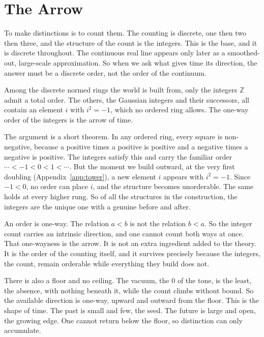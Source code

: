 \section{The Arrow} \label{sec:arrow}

To make distinctions is to count them. The counting is discrete, one then two then three, and the structure of the
count is the integers. This is the base, and it is discrete throughout. The continuous real line appears only later as
a smoothed-out, large-scale approximation. So when we ask what gives time its direction, the answer must be a discrete
order, not the order of the continuum.

\begin{principle}
Among the discrete normed rings the world is built from, only the integers $\mathbb{Z}$ admit a total order. The
others, the Gaussian integers and their successors, all contain an element $i$ with $i^2 = -1$, which no ordered ring
allows. The one-way order of the integers is the arrow of time.
\end{principle}

The argument is a short theorem. In any ordered ring, every square is non-negative, because a positive times a
positive is positive and a negative times a negative is positive. The integers satisfy this and carry the familiar
order $\cdots < -1 < 0 < 1 < \cdots$. But the moment we build outward, at the very first doubling (Appendix~\ref{app:tower}),
a new element $i$ appears with $i^2 = -1$. Since $-1 < 0$, no order can place $i$, and the structure becomes
unorderable. The same holds at every higher rung. So of all the structures in the construction, the integers are the
unique one with a genuine before and after.

An order is one-way. The relation $a < b$ is not the relation $b < a$. So the integer count carries an intrinsic
direction, and one cannot count both ways at once. That one-wayness is the arrow. It is not an extra ingredient added
to the theory. It is the order of the counting itself, and it survives precisely because the integers, the count,
remain orderable while everything they build does not.

There is also a floor and no ceiling. The vacuum, the $0$ of the tone, is the least, the absence, with nothing beneath
it, while the count climbs without bound. So the available direction is one-way, upward and outward from the floor.
This is the shape of time. The past is small and few, the seed. The future is large and open, the growing edge. One
cannot return below the floor, so distinction can only accumulate.

